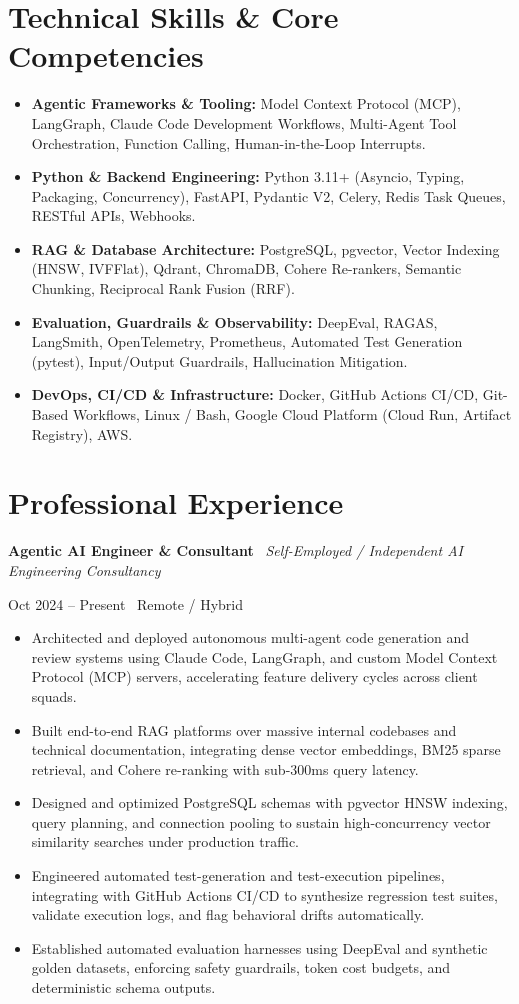 \documentclass[a4paper,10pt]{article}
\newcommand{\role}[4]{%
  \vspace{2pt}\noindent
  \begin{minipage}[t]{0.70\textwidth}\raggedright\textbf{#1} \textbullet\ \textit{#3}\end{minipage}%
  \hfill
  \begin{minipage}[t]{0.28\textwidth}\raggedleft\footnotesize\color{gray}#2 \textbullet\ #4\end{minipage}%
  \vspace{1pt}%
}
\begin{document}
\section{Technical Skills \& Core Competencies}
\begin{itemize}[leftmargin=1.2em, itemsep=2pt]
  \item \textbf{Agentic Frameworks \& Tooling:} Model Context Protocol (MCP), LangGraph, Claude Code Development Workflows, Multi-Agent Tool Orchestration, Function Calling, Human-in-the-Loop Interrupts.
  \item \textbf{Python \& Backend Engineering:} Python 3.11+ (Asyncio, Typing, Packaging, Concurrency), FastAPI, Pydantic V2, Celery, Redis Task Queues, RESTful APIs, Webhooks.
  \item \textbf{RAG \& Database Architecture:} PostgreSQL, pgvector, Vector Indexing (HNSW, IVFFlat), Qdrant, ChromaDB, Cohere Re-rankers, Semantic Chunking, Reciprocal Rank Fusion (RRF).
  \item \textbf{Evaluation, Guardrails \& Observability:} DeepEval, RAGAS, LangSmith, OpenTelemetry, Prometheus, Automated Test Generation (pytest), Input/Output Guardrails, Hallucination Mitigation.
  \item \textbf{DevOps, CI/CD \& Infrastructure:} Docker, GitHub Actions CI/CD, Git-Based Workflows, Linux / Bash, Google Cloud Platform (Cloud Run, Artifact Registry), AWS.
\end{itemize}

\section{Professional Experience}

\role{Agentic AI Engineer \& Consultant}{Oct 2024 -- Present}{Self-Employed / Independent AI Engineering Consultancy}{Remote / Hybrid}
\begin{itemize}
  \item Architected and deployed autonomous multi-agent code generation and review systems using Claude Code, LangGraph, and custom Model Context Protocol (MCP) servers, accelerating feature delivery cycles across client squads.
  \item Built end-to-end RAG platforms over massive internal codebases and technical documentation, integrating dense vector embeddings, BM25 sparse retrieval, and Cohere re-ranking with sub-300ms query latency.
  \item Designed and optimized PostgreSQL schemas with pgvector HNSW indexing, query planning, and connection pooling to sustain high-concurrency vector similarity searches under production traffic.
  \item Engineered automated test-generation and test-execution pipelines, integrating with GitHub Actions CI/CD to synthesize regression test suites, validate execution logs, and flag behavioral drifts automatically.
  \item Established automated evaluation harnesses using DeepEval and synthetic golden datasets, enforcing safety guardrails, token cost budgets, and deterministic schema outputs.
\end{itemize}
\end{document}
